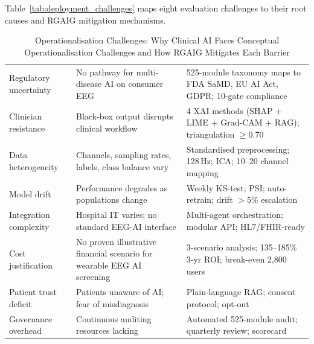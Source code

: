 Table~\ref{tab:deployment_challenges} maps eight evaluation challenges to their root causes and RGAIG mitigation mechanisms.

\begin{table}[!htbp]
\tablestripes\tablefontsize
\tablefontsize
\caption[Operationalisation Challenges (Conceptual) and Mitigation]{Operationalisation Challenges: Why Clinical AI Faces Conceptual Operationalisation Challenges and How RGAIG Mitigates Each Barrier}
\begin{tabularx}{\textwidth}{@{} >{\raggedright\arraybackslash}p{1.6cm} L L @{}}
\toprule
{} &  &  \\
\midrule
Regulatory uncertainty & No pathway for multi-disease AI on consumer EEG & 525-module taxonomy maps to FDA SaMD, EU AI Act, GDPR; 10-gate compliance \\
\addlinespace
Clinician resistance & Black-box output disrupts clinical workflow & 4 XAI methods (SHAP + LIME + Grad-CAM + RAG); triangulation $\geq$0.70 \\
\addlinespace
Data heterogeneity & Channels, sampling rates, labels, class balance vary & Standardised preprocessing; 128\,Hz; ICA; 10--20 channel mapping \\
\addlinespace
Model drift & Performance degrades as populations change & Weekly KS-test; PSI; auto-retrain; drift $>$5\% escalation \\
\addlinespace
Integration complexity & Hospital IT varies; no standard EEG-AI interface & Multi-agent orchestration; modular API; HL7/FHIR-ready \\
\addlinespace
Cost justification & No proven illustrative financial scenario for wearable EEG AI screening & 3-scenario analysis; 135--185\% 3-yr ROI; break-even 2{,}800 users \\
\addlinespace
Patient trust deficit & Patients unaware of AI; fear of misdiagnosis & Plain-language RAG; consent protocol; opt-out \\
\addlinespace
Governance overhead & Continuous auditing resources lacking & Automated 525-module audit; quarterly review; scorecard \\
\bottomrule
\end{tabularx}
\end{table}

